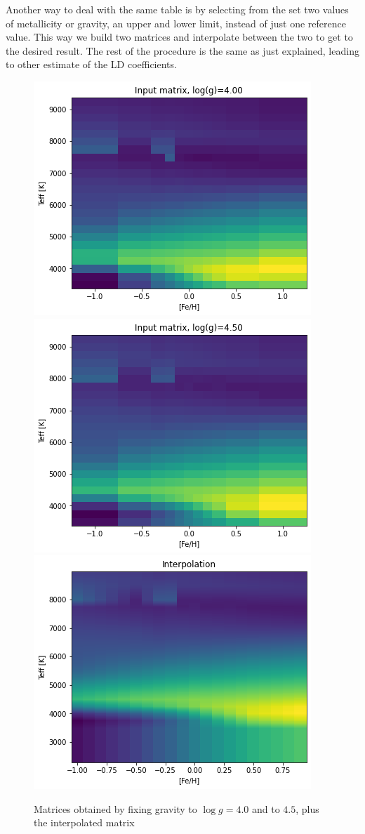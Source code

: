 \documentclass[a4paper,11pt,twocolumn]{article}
\begin{document}
Another way to deal with the same table is by selecting from the set two values
of metallicity or gravity, an upper and lower limit, instead of just one reference 
value. This way we build two matrices and 
interpolate between the two to get to the desired result. The rest of the procedure is 
the same as just explained, leading to other estimate of the LD coefficients.
\begin{figure}[H]
    \centering  
    \includegraphics[scale=0.35, angle=0]{../pictures/Claret2017/double_logg4}
    \includegraphics[scale=0.35, angle=0]{../pictures/Claret2017/double_logg45}
    \includegraphics[scale=0.35, angle=0]{../pictures/Claret2017/double_logg_interp}
    \caption{Matrices obtained by fixing gravity to $\log{g}=4.0$ and to $4.5$, plus the interpolated matrix}
\end{figure}
\end{document}
